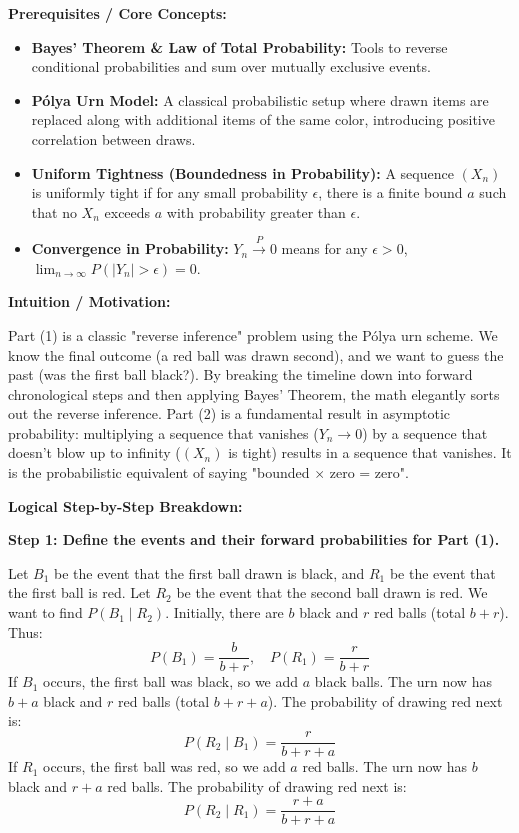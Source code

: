 \begin{solution}
\textbf{Prerequisites / Core Concepts:}
\begin{itemize}
    \item \textbf{Bayes' Theorem \& Law of Total Probability:} Tools to reverse conditional probabilities and sum over mutually exclusive events.
    \item \textbf{Pólya Urn Model:} A classical probabilistic setup where drawn items are replaced along with additional items of the same color, introducing positive correlation between draws.
    \item \textbf{Uniform Tightness (Boundedness in Probability):} A sequence $(X_n)$ is uniformly tight if for any small probability $\epsilon$, there is a finite bound $a$ such that no $X_n$ exceeds $a$ with probability greater than $\epsilon$.
    \item \textbf{Convergence in Probability:} $Y_n \xrightarrow{P} 0$ means for any $\epsilon > 0$, $\lim_{n \to \infty} P(|Y_n| > \epsilon) = 0$.
\end{itemize}

\textbf{Intuition / Motivation:}

Part (1) is a classic "reverse inference" problem using the Pólya urn scheme. We know the final outcome (a red ball was drawn second), and we want to guess the past (was the first ball black?). By breaking the timeline down into forward chronological steps and then applying Bayes' Theorem, the math elegantly sorts out the reverse inference.
Part (2) is a fundamental result in asymptotic probability: multiplying a sequence that vanishes ($Y_n \to 0$) by a sequence that doesn't blow up to infinity ($(X_n)$ is tight) results in a sequence that vanishes. It is the probabilistic equivalent of saying "bounded $\times$ zero = zero".

\textbf{Logical Step-by-Step Breakdown:}

\textbf{Step 1: Define the events and their forward probabilities for Part (1).}

Let $B_1$ be the event that the first ball drawn is black, and $R_1$ be the event that the first ball is red.
Let $R_2$ be the event that the second ball drawn is red. We want to find $P(B_1 \mid R_2)$.
Initially, there are $b$ black and $r$ red balls (total $b+r$). Thus:
\[ P(B_1) = \frac{b}{b+r}, \quad P(R_1) = \frac{r}{b+r} \]
If $B_1$ occurs, the first ball was black, so we add $a$ black balls. The urn now has $b+a$ black and $r$ red balls (total $b+r+a$). The probability of drawing red next is:
\[ P(R_2 \mid B_1) = \frac{r}{b+r+a} \]
If $R_1$ occurs, the first ball was red, so we add $a$ red balls. The urn now has $b$ black and $r+a$ red balls. The probability of drawing red next is:
\[ P(R_2 \mid R_1) = \frac{r+a}{b+r+a} \]


\end{solution}
